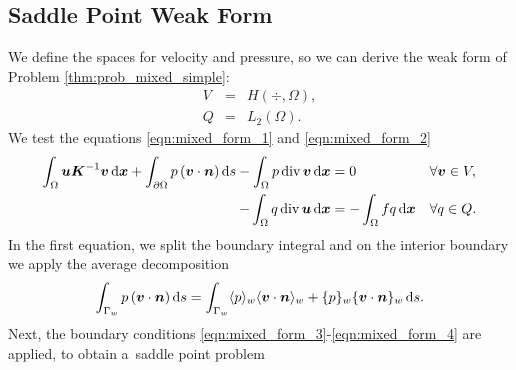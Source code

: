 \subsection{Saddle Point Weak Form}
We define the spaces for velocity and pressure,
so we can derive the weak form of Problem \ref{thm:prob_mixed_simple}:
\begin{eqnarray}    
    V &=& H(\div,\Omega), \label{eqn:space_V}\\
    Q &=& L_2(\Omega). \label{eqn:space_Q}
\end{eqnarray}
We test the equations \eqref{eqn:mixed_form_1} and \eqref{eqn:mixed_form_2}
\begin{align}
    \int_\Omega \mathbf{\boldsymbol{u}} \mathbf{\boldsymbol{K}}^{-1} \mathbf{\boldsymbol{v}} \,{\rm d}\mathbf{\boldsymbol{x}}
    + \int_{\partial\Omega} p \,(\mathbf{\boldsymbol{v}} \cdot \mathbf{\boldsymbol{n}}) \,{\rm d} s
    - \int_\Omega p\,{\rm div}\, \mathbf{\boldsymbol{v}} \,{\rm d}\mathbf{\boldsymbol{x}} &= 0 && \forall \mathbf{\boldsymbol{v}}\in V, \label{eqn:mixed_weak_1}\\
    - \int_\Omega q\,{\rm div}\, \mathbf{\boldsymbol{u}} \,{\rm d}\mathbf{\boldsymbol{x}} &= - \int_\Omega fq \,{\rm d}\mathbf{\boldsymbol{x}} &&  \forall q\in Q. \label{eqn:mixed_weak_2}
\end{align}
%
In the first equation, we split the boundary integral and on the interior boundary we apply the average decomposition
\begin{align}
    \int_{\Gamma_w} p \,(\mathbf{\boldsymbol{v}} \cdot \mathbf{\boldsymbol{n}}) \,{\rm d} s
    = \int_{\Gamma_w} \langle p\rangle_w \langle\mathbf{\boldsymbol{v}} \cdot \mathbf{\boldsymbol{n}}\rangle_w + \{p\}_w \{\mathbf{\boldsymbol{v}} \cdot \mathbf{\boldsymbol{n}}\}_w \,{\rm d} s.
\end{align}
Next, the boundary conditions \eqref{eqn:mixed_form_3}-\eqref{eqn:mixed_form_4} are applied, 
to obtain a~saddle point problem
%
